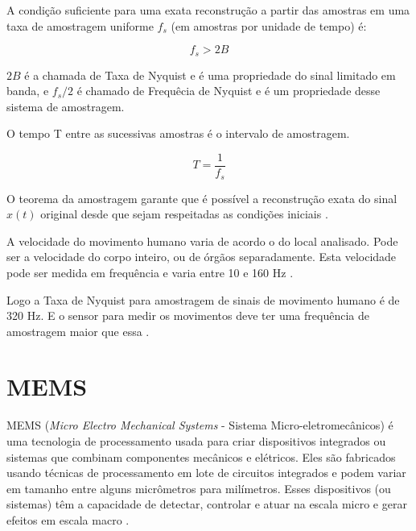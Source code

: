 A condição suficiente para uma exata reconstrução a partir das amostras em uma taxa de amostragem uniforme $ f_{s} $ (em amostras por unidade de tempo) é:

\begin{equation}
f_{s}>2B 
\end{equation}

$2B$ é a chamada de Taxa de Nyquist e é uma propriedade do sinal limitado em banda, e $f_{s}/2$ é chamado de Frequêcia de Nyquist e é um propriedade desse sistema de amostragem.

O tempo T entre as sucessivas amostras é o intervalo de amostragem.

\begin{equation}
T=\frac{1}{f_{s}}
\end{equation}

O teorema da amostragem garante que é possível a reconstrução exata do sinal $ x(t) $ original desde que sejam respeitadas as condições iniciais \cite{willsky2010}.

A velocidade do movimento humano varia de  acordo o do local analisado. Pode ser a velocidade do corpo inteiro, ou de órgãos separadamente. Esta velocidade pode ser medida em frequência e varia entre 10 e 160 Hz \cite{song2016}.

Logo a Taxa de Nyquist para amostragem de sinais de movimento humano é de 320 Hz. E o sensor para medir os movimentos deve ter uma frequência de amostragem maior que essa \cite{song2016}. 


	\section{MEMS}

		MEMS (\textit{Micro Electro Mechanical Systems} - Sistema Micro-eletromecânicos) é uma tecnologia de processamento usada para criar dispositivos integrados ou sistemas que combinam componentes mecânicos e elétricos. Eles são fabricados usando técnicas de processamento em lote de circuitos integrados e podem variar em tamanho entre alguns micrômetros para milímetros. Esses dispositivos (ou sistemas) têm a capacidade de detectar, controlar e atuar na escala micro e gerar efeitos em escala macro \cite{prime2002}. 

